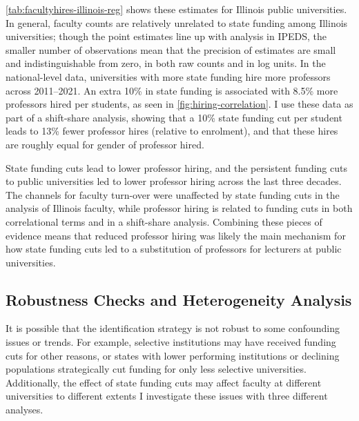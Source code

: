 \autoref{tab:facultyhires-illinois-reg} shows these estimates for Illinois public universities.
In general, faculty counts are relatively unrelated to state funding among Illinois universities; though the point estimates line up with analysis in IPEDS, the smaller number of observations mean that the precision of estimates are small and indistinguishable from zero, in both raw counts and in log units.
In the national-level \cite{wapman2022quantifying} data, universities with more state funding hire more professors across 2011--2021.
An extra 10\% in state funding is associated with 8.5\% more professors hired per students, as seen in \autoref{fig:hiring-correlation}.
I use these data as part of a shift-share analysis, showing that a 10\% state funding cut per student leads to 13\% fewer professor hires (relative to enrolment), and that these hires are roughly equal for gender of professor hired.

State funding cuts lead to lower professor hiring, and the persistent funding cuts to public universities led to lower professor hiring across the last three decades.
The channels for faculty turn-over were unaffected by state funding cuts in the analysis of Illinois faculty, while professor hiring is related to funding cuts in both correlational terms and in a shift-share analysis.
Combining these pieces of evidence means that reduced professor hiring was likely the main mechanism for how state funding cuts led to a substitution of professors for lecturers at public universities.

\subsection{Robustness Checks and Heterogeneity Analysis}
\label{sec:results-robustness}
It is possible that the identification strategy is not robust to some confounding issues or trends.
For example, selective institutions may have received funding cuts for other reasons, or states with lower performing institutions or declining populations strategically cut funding for only less selective universities.
Additionally, the effect of state funding cuts may affect faculty at different universities to different extents
I investigate these issues with three different analyses.

